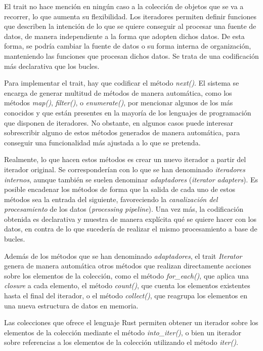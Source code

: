 \documentclass[a4paper,11pt]{extarticle}
\begin{document}
El trait no hace mención en ningún caso a la colección de objetos que se va a recorrer, lo que aumenta su flexibilidad. Los iteradores permiten definir funciones que describen la intención de lo que se quiere conseguir al procesar una fuente de datos, de manera independiente a la forma que adopten dichos datos. De esta forma, se podría cambiar la fuente de datos o su forma interna de organización, manteniendo las funciones que procesan dichos datos. Se trata de una codificación más declarativa que los bucles.

Para implementar el trait, hay que codificar el método \textit{next()}. El sistema se encarga de generar multitud de métodos de manera automática, como los métodos \textit{map()}, \textit{filter()}, o \textit{enumerate()}, por mencionar algunos de los más conocidos y que están presentes en la mayoría de los lenguajes de programación que disponen de iteradores. No obstante, en algunos casos puede  interesar sobrescribir alguno de estos métodos generados de manera automática, para conseguir una funcionalidad más ajustada a lo que se pretenda.

Realmente, lo que hacen estos métodos es crear un nuevo iterador a partir del iterador original. Se corresponderían con lo que se han denominado \textit{iteradores internos}, aunque también se suelen denominar \textit{adaptadores} (\textit{iterator adapters}). Es posible encadenar los métodos de forma que la salida de cada uno de estos métodos sea la entrada del siguiente, favoreciendo la \textit{canalización del procesamiento} de los datos (\textit{processing pipeline}). Una vez más, la codificación obtenida es declarativa y muestra de manera explícita qué se quiere hacer con los datos, en contra de lo que sucedería de realizar el mismo procesamiento a base de bucles.

Además de los métodos que se han denominado \textit{adaptadores}, el trait \textit{Iterator} genera de manera automática otros métodos que realizan directamente acciones sobre los elementos de la colección, como el método \textit{for\_each()}, que aplica una \textit{closure} a cada elemento, el método \textit{count()}, que cuenta los elementos existentes hasta el final del iterador, o el método \textit{collect()}, que reagrupa los elementos en una nueva estructura de datos en memoria.

Las colecciones que ofrece el lenguaje Rust permiten obtener un iterador sobre los elementos de la colección mediante el método \textit{into\_iter()}, o bien un iterador 
sobre referencias a los elementos de la colección utilizando el método \textit{iter()}.
\end{document}

